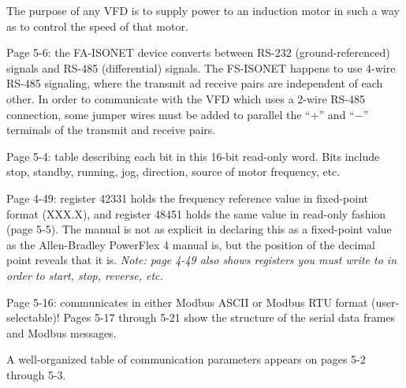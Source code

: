 












The purpose of any VFD is to supply power to an induction motor in such a way as to control the speed of that motor.

\vskip 10pt

Page 5-6: the FA-ISONET device converts between RS-232 (ground-referenced) signals and RS-485 (differential) signals.  The FS-ISONET happens to use 4-wire RS-485 signaling, where the transmit ad receive pairs are independent of each other.  In order to communicate with the VFD which uses a 2-wire RS-485 connection, some jumper wires must be added to parallel the ``+'' and ``$-$'' terminals of the transmit and receive pairs.

\vskip 10pt

Page 5-4: table describing each bit in this 16-bit read-only word.  Bits include stop, standby, running, jog, direction, source of motor frequency, etc.

\vskip 10pt

Page 4-49: register 42331 holds the frequency reference value in fixed-point format (XXX.X), and register 48451 holds the same value in read-only fashion (page 5-5).  The manual is not as explicit in declaring this as a fixed-point value as the Allen-Bradley PowerFlex 4 manual is, but the position of the decimal point reveals that it is.  {\it Note: page 4-49 also shows registers you must write to in order to start, stop, reverse, etc.}

\vskip 10pt

Page 5-16: communicates in either Modbus ASCII or Modbus RTU format (user-selectable)!  Pages 5-17 through 5-21 show the structure of the serial data frames and Modbus messages.

\vskip 10pt

A well-organized table of communication parameters appears on pages 5-2 through 5-3.




